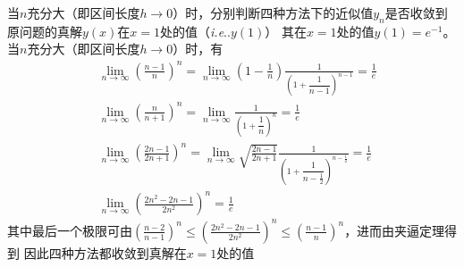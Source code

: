 \documentclass[11pt]{article}
\makeatletter
\DeclareRobustCommand\onedot{\futurelet\@let@token\@onedot}
\def\@onedot{\ifx\@let@token.\else.\null\fi\xspace}
\def\ie{\emph{i.e}\onedot}
\makeatother
\begin{document}
\begin{question}
\begin{subquestion}{当$n$充分大（即区间长度$h \rightarrow 0$）时，分别判断四种方法下的近似值$y_n$是否收敛到原问题的真解$y(x)$在$x = 1$处的值（\ie $y(1)$）}
{            其在$x = 1$处的值$y(1) = e^{-1}$。当$n$充分大（即区间长度$h \rightarrow 0$）时，有
            \begin{align*}
                 & \lim_{n \rightarrow \infty}\left(\frac{n - 1}{n}\right)^{n} = \lim_{n \rightarrow \infty}\left(1 - \frac{1}{n}\right)\frac{1}{\left(1 + \dfrac{1}{n - 1}\right)^{n - 1}} = \frac{1}{e}                            \\
                 & \lim_{n \rightarrow \infty}\left(\frac{n}{n + 1}\right)^{n} = \lim_{n \rightarrow \infty}\frac{1}{\left(1 + \dfrac{1}{n}\right)^{n}} = \frac{1}{e}                                                                \\
                 & \lim_{n \rightarrow \infty}\left(\frac{2n - 1}{2n + 1}\right)^{n} = \lim_{n \rightarrow \infty}\sqrt{\frac{2n - 1}{2n + 1}}\frac{1}{\left(1 + \dfrac{1}{n - \frac{1}{2}}\right)^{n - \frac{1}{2}}} =  \frac{1}{e} \\
                 & \lim_{n \rightarrow \infty}\left(\frac{2n^2 - 2n - 1}{2n^2}\right)^{n} = \frac{1}{e}
            \end{align*}
            其中最后一个极限可由$\left(\displaystyle \frac{n - 2}{n - 1}\right)^{n} \leqslant \left(\displaystyle \frac{2n^2 - 2n - 1}{2n^2}\right)^{n} \leqslant \left(\displaystyle \frac{n - 1}{n}\right)^{n}$，进而由夹逼定理得到
            因此四种方法都收敛到真解在$x = 1$处的值
        }
    \end{subquestion}
\end{question}
\end{document}
